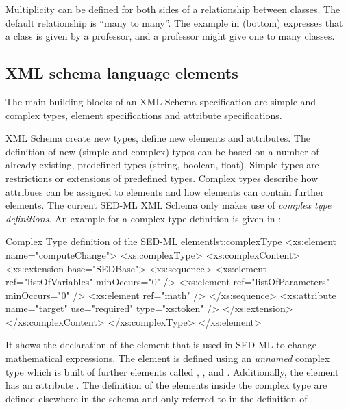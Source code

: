 Multiplicity can be defined for both sides of a relationship between classes. The default relationship is ``many to many''. The example in  (bottom) expresses that a class is given by a professor, and a professor might give one to many classes.


\subsection{XML schema language elements}
The main building blocks of an XML Schema specification are simple and complex types, element specifications and attribute specifications.

XML Schema  create new types,  define new elements and attributes.
The definition of new (simple and complex) types can be based on a number of already existing, predefined types (string, boolean, float). Simple types are restrictions or extensions of predefined types. Complex types describe how attribues can be assigned to elements and how elements can contain further elements. The current SED-ML XML Schema only makes use of \emph{complex type definitions}. An example for a complex type definition is given in :

\begin{myXmlLst}{Complex Type definition of the SED-ML  element}{lst:complexType}
<xs:element name="computeChange">
	<xs:complexType>
		<xs:complexContent>
			<xs:extension base="SEDBase">
				<xs:sequence>
					<xs:element ref="listOfVariables" minOccurs="0" />
					<xs:element ref="listOfParameters" minOccurs="0" />
					<xs:element ref="math" />
				</xs:sequence>
				<xs:attribute name="target" use="required" type="xs:token" />
			</xs:extension>
		</xs:complexContent>
	</xs:complexType>
</xs:element>
\end{myXmlLst}

It shows the declaration of the element  that is used in SED-ML to change mathematical expressions. The element is defined using an \emph{unnamed} complex type which is built of further elements called , , and . Additionally, the element  has an attribute . The definition of the elements inside the complex type are defined elsewhere in the schema and only referred to in the definition of .

